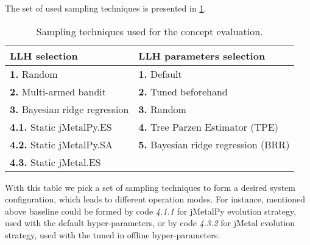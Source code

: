 The set of used sampling techniques is presented in \cref{eval: concept settings table}.
\begin{table}[h!]
	\centering
	\begin{tabular}{ll}
		\hline
		\rowcolor{gray!10}
		\textbf{LLH selection} & \textbf{LLH parameters selection} \\
		\hline
		\textbf{1.} Random & \textbf{1.} Default \\
		\textbf{2.} Multi-armed bandit & \textbf{2.} Tuned beforehand \\
		\textbf{3.} Bayesian ridge regression & \textbf{3.} Random \\
		\textbf{4.1.} Static jMetalPy.ES & \textbf{4.} Tree Parzen Estimator (TPE) \\
		\textbf{4.2.} Static jMetalPy.SA & \textbf{5.} Bayesian ridge regression (BRR) \\
		\textbf{4.3.} Static jMetal.ES & \\
		\hline
	\end{tabular}
	
	\caption{Sampling techniques used for the concept evaluation.}
	\label{eval: concept settings table}
\end{table}


With this table we pick a set of sampling techniques to form a desired system configuration, which leads to different operation modes. For instance, mentioned above baseline could be formed by code \emph{4.1.1} for jMetalPy evolution strategy, used with the default hyper-parameters, or by code \emph{4.3.2} for jMetal evolution strategy, used with the tuned in offline hyper-parameters.

